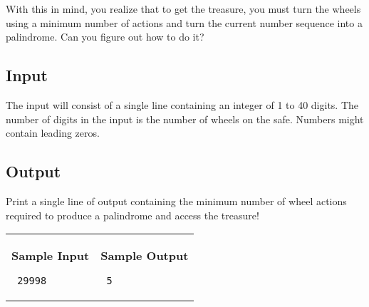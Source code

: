 \documentclass[11pt]{article}
\begin{document}
With this in mind, you realize that to get the treasure, you must turn the wheels using a minimum number of actions and turn the current number sequence into a palindrome. Can you figure out how to do it?

\subsection*{Input}

The input will consist of a single line containing an integer of 1 to 40 digits. The number of digits in the input is the number of wheels on the safe. Numbers might contain leading zeros.

\subsection*{Output}

Print a single line of output containing the minimum number of wheel actions required to produce a palindrome and access the treasure!


\vspace{0.25in}\hspace{-0.3in}\begin{tabular}{ll}

\parbox{3in}{{\large\bf Sample Input}

\vspace{0.15in}

{\tt 
29998
}
}

&

\parbox{3in}{{\large\bf Sample Output}

\vspace{0.15in}

{\tt
5
}


}

\\
\end{tabular}
\end{document}
